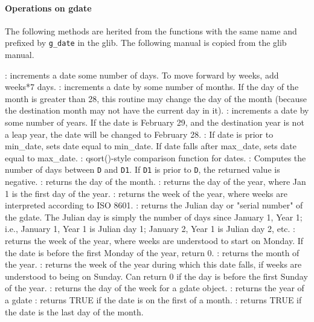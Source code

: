 \paragraph{Operations on gdate}
The following methods are herited from the functions with the same name and prefixed 
by \verb+g_date+ in the glib. The following manual is copied from the glib manual.
  \begin{varlist}
    : increments a date some number of days. To move forward by weeks, add weeks*7 days. 
    : increments a date by some number of months. If the day of the month is greater than 28, 
    this routine may change the day of the month (because the destination month may not have the current day in it). 
    : increments a date by some number of years. If the date is February 29, 
    and the destination year is not a leap year, the date will be changed to February 28. 
    : If date is prior to min_date, sets date equal to min_date. If date falls 
    after max_date, sets date equal to max_date. 
    : qsort()-style comparison function for dates.
    : Computes the number of days between \verb+D+ and \verb+D1+.
    If \verb+D1+ is prior to \verb+D+, the returned value is negative. 
    : returns the day of the month.
    : returns the day of the year, where Jan 1 is the first day of the year. 
    : returns the week of the year, where weeks are interpreted according to ISO 8601.
    : returns the Julian day or "serial number" of the gdate. The Julian day is simply the number 
    of days since January 1, Year 1; i.e., January 1, Year 1 is Julian day 1; January 2, Year 1 is Julian day 2, etc. 
    : returns the week of the year, where weeks are understood to start on Monday. 
    If the date is before the first Monday of the year, return 0. 
    : returns the month of the year.
    : returns the week of the year during which this date falls, if weeks are understood to being on Sunday.  Can return 0 if the day is before the first Sunday of the year.
    : returns the day of the week for a gdate object.
    : returns the year of a gdate
    : returns TRUE if the date is on the first of a month. 
    : returns TRUE if the date is the last day of the month. 

\end{varlist}
